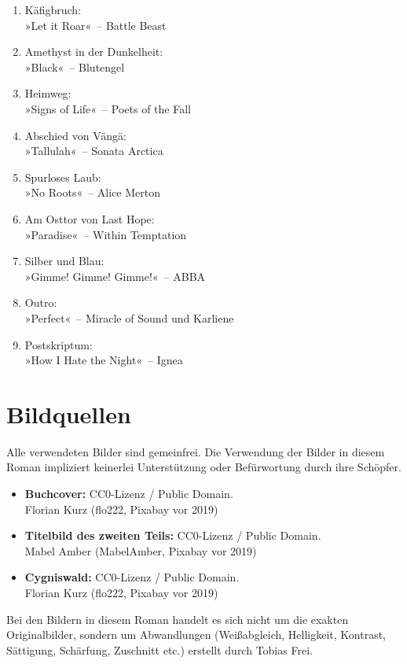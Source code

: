 \begin{enumerate}
    \item Käfigbruch:\\ »Let it Roar«~– Battle Beast
    \item Amethyst in der Dunkelheit:\\ »Black«~– Blutengel
    \item Heimweg:\\ »Signs of Life«~– Poets of the Fall
    \item Abschied von Vängä:\\ »Tallulah«~– Sonata Arctica
    \item Spurloses Laub:\\ »No Roots«~– Alice Merton
    \item Am Osttor von Last Hope:\\ »Paradise«~– Within Temptation
    \item Silber und Blau:\\ »Gimme! Gimme! Gimme!«~– ABBA
    \item Outro:\\ »Perfect«~– Miracle of Sound und Karliene
    \item Postskriptum:\\ »How I Hate the Night«~– Ignea
\end{enumerate}


\chapter{Bildquellen}

Alle verwendeten Bilder sind gemeinfrei. Die Verwendung der Bilder in diesem Roman impliziert keinerlei Unterstützung oder Befürwortung durch ihre Schöpfer.

\begin{itemize}
    \item \textbf{Buchcover:} CC0-Lizenz / Public Domain.\\ Florian Kurz (flo222, Pixabay vor 2019)
    \item \textbf{Titelbild des zweiten Teils:} CC0-Lizenz / Public Domain.\\ Mabel Amber (MabelAmber, Pixabay vor 2019)
    \item \textbf{Cygniswald:} CC0-Lizenz / Public Domain.\\ Florian Kurz (flo222, Pixabay vor 2019)
\end{itemize}

Bei den Bildern in diesem Roman handelt es sich nicht um die exakten Originalbilder, sondern um Abwandlungen (Weißabgleich, Helligkeit, Kontrast, Sättigung, Schärfung, Zuschnitt etc.) erstellt durch Tobias Frei.



